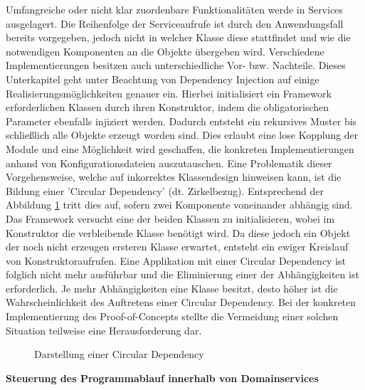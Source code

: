 Umfangreiche oder nicht klar zuordenbare Funktionalitäten werde in Services ausgelagert. Die Reihenfolge der Serviceaufrufe ist durch den Anwendungsfall bereits vorgegeben, jedoch nicht in welcher Klasse diese stattfindet und wie die notwendigen Komponenten an die Objekte übergeben wird. Verschiedene Implementierungen besitzen auch unterschiedliche Vor- bzw. Nachteile. Dieses Unterkapitel geht unter Beachtung von Dependency Injection auf einige Realisierungsmöglichkeiten genauer ein. Hierbei initialisiert ein Framework erforderlichen Klassen durch ihren Konstruktor, indem die obligatorischen Parameter ebenfalls injiziert werden. Dadurch entsteht ein rekursives Muster bis schließlich alle Objekte erzeugt worden sind. Dies erlaubt eine lose Kopplung der Module und eine Möglichkeit wird geschaffen, die konkreten Implementierungen anhand von Konfigurationsdateien auszutauschen. Eine Problematik dieser Vorgehensweise, welche auf inkorrektes Klassendesign hinweisen kann, ist die Bildung einer 'Circular Dependency' (dt. Zirkelbezug). Entsprechend der Abbildung \ref{fig:circulardependency} tritt dies auf, sofern zwei Komponente voneinander abhängig sind. Das Framework versucht eine der beiden Klassen zu initialisieren, wobei im Konstruktor die verbleibende Klasse benötigt wird. Da diese jedoch ein Objekt der noch nicht erzeugen ersteren Klasse erwartet, entsteht ein ewiger Kreislauf von Konstruktoraufrufen. Eine Applikation mit einer Circular Dependency ist folglich nicht mehr ausführbar und die Eliminierung einer der Abhängigkeiten ist erforderlich. Je mehr Abhängigkeiten eine Klasse besitzt, desto höher ist die Wahrscheinlichkeit des Auftretens einer Circular Dependency. Bei der konkreten Implementierung des Proof-of-Concepts stellte die Vermeidung einer solchen Situation teilweise eine Herausforderung dar. \cite[S. 93ff.]{Suryanarayana.2015}

\begin{figure}[htbp]
	\centering
	\footnotesize
	
	\caption{Darstellung einer Circular Dependency}
	\label{fig:circulardependency}
\end{figure}


\textbf{Steuerung des Programmablauf innerhalb von Domainservices}

